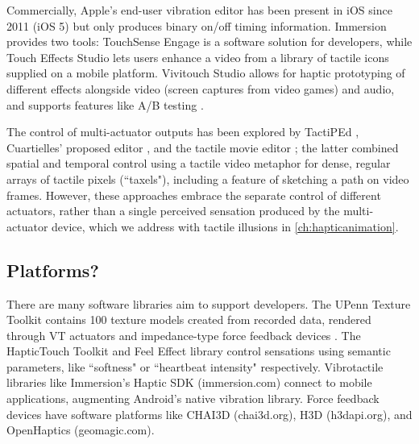 Commercially, Apple's end-user vibration editor has been present in iOS since 2011 (iOS 5) but only produces binary on/off timing information.
Immersion provides two tools: TouchSense Engage is a software solution for developers, while Touch Effects Studio lets users enhance a video from a  library of tactile icons supplied on a mobile platform.
Vivitouch Studio allows for haptic prototyping of different effects alongside video (screen captures from video games) and audio, and supports features like A/B testing \cite{Swindells2014}.


The control of multi-actuator outputs has been explored by TactiPEd \cite{Paneels2013}, Cuartielles' proposed editor \cite{Cuartielles2012}, and the tactile movie editor \cite{Kim2009}; the latter combined spatial and temporal control using a tactile video metaphor for dense, regular arrays of tactile pixels (``taxels"), including a feature of sketching a path on video frames. 
However, these approaches embrace the separate control of different actuators, rather than a single perceived sensation produced by the multi-actuator device, which we address with tactile illusions in \autoref{ch:hapticanimation}.




\subsection{Platforms?}

There are many software libraries aim to support developers.
The UPenn Texture Toolkit contains 100 texture models created from recorded data, rendered through VT actuators and impedance-type force feedback devices \cite{Culbertson2014}.
The HapticTouch Toolkit \cite{Ledo2012} and Feel Effect library \cite{Israr2014} control sensations using semantic parameters, like ``softness" or ``heartbeat intensity" respectively.
Vibrotactile libraries like Immersion's Haptic SDK (immersion.com) connect to mobile applications, augmenting Android's native vibration library.
Force feedback devices have software platforms like CHAI3D (chai3d.org), H3D (h3dapi.org), and OpenHaptics (geomagic.com). 

